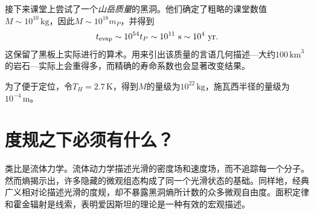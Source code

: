 接下来课堂上尝试了一个\emph{山岳质量}的黑洞。他们确定了粗略的课堂数值\(M\sim10^{10}\,\mathrm{kg}\)，因此\(M\sim10^{18}m_P\)，并得到
\begin{equation}
t_{\mathrm{evap}}\sim10^{54}t_P
\sim10^{11}\ {\rm s}
\sim10^4\ {\rm yr}.
\end{equation}
这保留了黑板上实际进行的算术。用来引出该质量的言语几何描述---大约\(100\,\mathrm{km}^3\)的岩石---实际上会重得多，而精确的寿命系数也会显著改变结果。

\begin{classroomqa}
\end{classroomqa}

\begin{classroomqa}
\end{classroomqa}

为了便于定位，令\(T_H=2.7\,\mathrm{K}\)，得到\(M\)的量级为\(10^{22}\,\mathrm{kg}\)，施瓦西半径的量级为\(10^{-4}\,\mathrm{m}\)。

\section{度规之下必须有什么？}

\begin{classroomqa}
\end{classroomqa}

类比是流体力学。流体动力学描述光滑的密度场和速度场，而不追踪每一个分子。然而熵揭示出，许多隐藏的微观组态构成了同一个光滑状态的基础。同样地，经典广义相对论描述光滑的度规，却不暴露黑洞熵所计数的众多微观自由度。面积定律和霍金辐射是线索，表明爱因斯坦的理论是一种有效的宏观描述。

